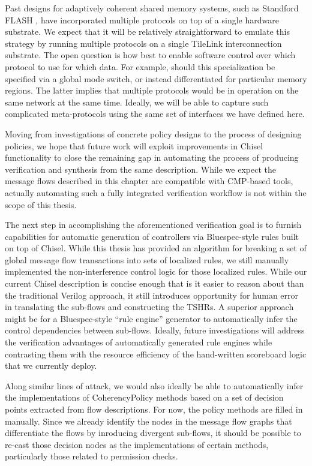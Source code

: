Past designs for adaptively coherent shared memory systems, such as Standford FLASH \cite{kuskin-archnews94}, 
have incorporated multiple protocols on top of a single hardware substrate. 
We expect that it will be relatively straightforward  to emulate this strategy by
running multiple protocols on a single TileLink interconnection substrate.
The open question is how best to enable software control over which protocol to use for which data.
For example, should this specialization be specified via a global mode switch, or instead
differentiated for particular memory regions.
The latter implies that multiple protocols would be in operation on the same network at the same time.
Ideally, we will be able to capture such complicated meta-protocols using the same set of interfaces we have defined here.

Moving from investigations of concrete policy designs to the process of designing policies,
we hope that future work will exploit improvements in Chisel functionality to close the remaining gap in
automating the process of producing verification and synthesis from the same description.
While we expect the message flows described in this chapter are compatible with CMP-based tools,
actually automating such a fully integrated verification workflow is not within the scope of this thesis.

The next step in accomplishing the aforementioned verification goal is to furnish capabilities for
automatic generation of controllers via Bluespec-style rules built on top of Chisel.
While this thesis has provided an algorithm for  breaking a set of
global message flow transactions into sets of localized rules,
we still manually implemented the non-interference control logic for those localized rules.
While our current Chisel description is concise enough that is it easier to reason about than the traditional Verilog approach,
it still introduces opportunity for human error in translating the sub-flows and constructing the TSHRs.
A superior approach might be for a Bluespec-style ``rule engine'' generator to automatically infer the control dependencies between sub-flows.
Ideally, future investigations will address the verification advantages of automatically generated rule engines while
contrasting them with the resource efficiency of the hand-written scoreboard logic that we currently deploy.

Along similar lines of attack, we would also ideally be able to automatically infer the implementations of CoherencyPolicy methods
based on a set of decision points extracted from flow descriptions.
For now, the policy methods are filled in manually.
Since we already identify the nodes in the message flow graphs that differentiate the flows by
inroducing divergent sub-flows, it should be possible to re-cast those decision nodes as the implementations of certain methods,
particularly those related to permission checks.

